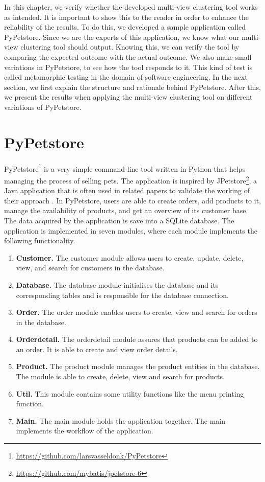 In this chapter, we verify whether the developed multi-view clustering tool works as intended. It is important to show this to the reader in order to enhance the reliability of the results. To do this, we developed a sample application called PyPetstore. Since we are the experts of this application, we know what our multi-view clustering tool should output. Knowing this, we can verify the tool by comparing the expected outcome with the actual outcome. We also make small variations in PyPetstore, to see how the tool responds to it. This kind of test is called metamorphic testing in the domain of software engineering. In the next section, we first explain the structure and rationale behind PyPetstore. After this, we present the results when applying the multi-view clustering tool on different variations of PyPetstore.

\section{PyPetstore}
PyPetstore\footnote{\href{https://github.com/larsvasseldonk/PyPetstore}{https://github.com/larsvasseldonk/PyPetstore}} is a very simple command-line tool written in Python that helps managing the process of selling pets. The application is inspired by JPetstore\footnote{\href{https://github.com/mybatis/jpetstore-6}{https://github.com/mybatis/jpetstore-6}}, a Java application that is often used in related papers to validate the working of their approach \cite{al2021microservice, jin2018functionality, jin2019service, saidani2019towards, zhang2020automated}. 
In PyPetstore, users are able to create orders, add products to it, manage the availability of products, and get an overview of its customer base. The data acquired by the application is save into a SQLite database.
The application is implemented in seven modules, where each module implements the following functionality.

\begin{enumerate}
    \item \textbf{Customer.} The customer module allows users to create, update, delete, view, and search for customers in the database.
    \item \textbf{Database.} The database module initialises the database and its corresponding tables and is responsible for the database connection.
    \item \textbf{Order.} The order module enables users to create, view and search for orders in the database.
    \item \textbf{Orderdetail.} The orderdetail module assures that products can be added to an order. It is able to create and view order details.
    \item \textbf{Product.} The product module manages the product entities in the database. The module is able to create, delete, view and search for products.
    \item \textbf{Util.} This module contains some utility functions like the menu printing function.
    \item \textbf{Main.} The main module holds the application together. The main implements the workflow of the application.
\end{enumerate}

